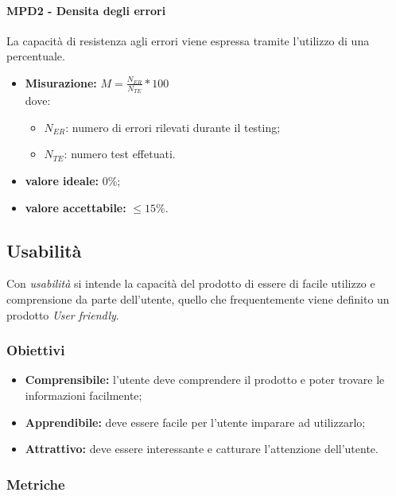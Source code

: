 \paragraph{MPD2 - Densita degli errori} La capacità di resistenza agli errori viene espressa tramite l'utilizzo di una percentuale.
\begin{itemize}
	\item \textbf{Misurazione:} \begin{math}M=\frac{N_{ER}}{N_{TE}}*100\end{math}\\
	dove:
	\begin {itemize}
		\item \begin{math}N_{ER}\end{math}: numero di errori rilevati durante il testing;
		\item \begin{math}N_{TE}\end{math}: numero test effetuati.
	\end{itemize}
	\item \textbf{valore ideale:} 0\%;
	\item \textbf{valore accettabile:}  \begin{math}\leq15\%\end{math}.
\end{itemize}

\subsection{Usabilità}
Con \textit{usabilità} si intende la capacità del prodotto di essere di facile utilizzo e comprensione da parte dell'utente, quello che frequentemente viene definito un prodotto \textit{User friendly}.
\subsubsection{Obiettivi}
\begin {itemize}
	\item \textbf{Comprensibile:} l'utente deve comprendere il prodotto e poter trovare le informazioni facilmente;
	\item \textbf{Apprendibile:} deve essere facile per l'utente imparare ad utilizzarlo;
	\item \textbf{Attrattivo:} deve essere interessante e catturare l'attenzione dell'utente.
\end{itemize}
\subsubsection{Metriche}
